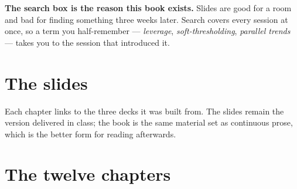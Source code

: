 \documentclass[
  letterpaper,
  10pt,
  twoside,
  openright,
  numbers=noenddot,
  chapterprefix=true]{scrbook}
\begin{document}
\begin{qmibstep}

\textbf{The search box is the reason this book exists.} Slides are good
for a room and bad for finding something three weeks later. Search
covers every session at once, so a term you half-remember ---
\emph{leverage}, \emph{soft-thresholding}, \emph{parallel trends} ---
takes you to the session that introduced it.

\end{qmibstep}

\section*{The slides}\label{the-slides}


Each chapter links to the three decks it was built from. The slides
remain the version delivered in class; the book is the same material set
as continuous prose, which is the better form for reading afterwards.

\section*{The twelve chapters}\label{the-twelve-chapters}

\end{document}
